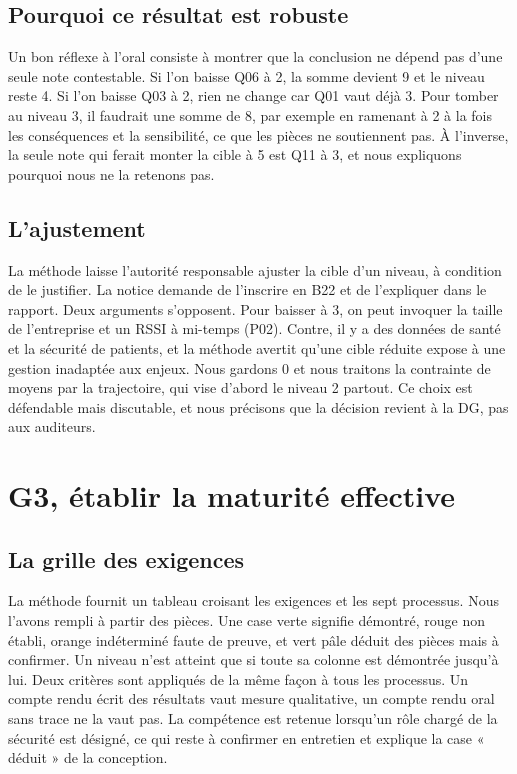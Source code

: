 \documentclass[11pt,a4paper]{article}
\begin{document}
\subsection{Pourquoi ce résultat est robuste}

Un bon réflexe à l'oral consiste à montrer que la conclusion ne dépend pas d'une seule note contestable. Si l'on baisse Q06 à 2, la somme devient 9 et le niveau reste 4. Si l'on baisse Q03 à 2, rien ne change car Q01 vaut déjà 3. Pour tomber au niveau 3, il faudrait une somme de 8, par exemple en ramenant à 2 à la fois les conséquences et la sensibilité, ce que les pièces ne soutiennent pas. À l'inverse, la seule note qui ferait monter la cible à 5 est Q11 à 3, et nous expliquons pourquoi nous ne la retenons pas.

\subsection{L'ajustement}

La méthode laisse l'autorité responsable ajuster la cible d'un niveau, à condition de le justifier. La notice demande de l'inscrire en B22 et de l'expliquer dans le rapport. Deux arguments s'opposent. Pour baisser à 3, on peut invoquer la taille de l'entreprise et un RSSI à mi-temps (P02). Contre, il y a des données de santé et la sécurité de patients, et la méthode avertit qu'une cible réduite expose à une gestion inadaptée aux enjeux. Nous gardons 0 et nous traitons la contrainte de moyens par la trajectoire, qui vise d'abord le niveau 2 partout. Ce choix est défendable mais discutable, et nous précisons que la décision revient à la DG, pas aux auditeurs.

\section{G3, établir la maturité effective}

\subsection{La grille des exigences}

La méthode fournit un tableau croisant les exigences et les sept processus. Nous l'avons rempli à partir des pièces. Une case verte signifie démontré, rouge non établi, orange indéterminé faute de preuve, et vert pâle déduit des pièces mais à confirmer. Un niveau n'est atteint que si toute sa colonne est démontrée jusqu'à lui. Deux critères sont appliqués de la même façon à tous les processus. Un compte rendu écrit des résultats vaut mesure qualitative, un compte rendu oral sans trace ne la vaut pas. La compétence est retenue lorsqu'un rôle chargé de la sécurité est désigné, ce qui reste à confirmer en entretien et explique la case « déduit » de la conception.
\end{document}
